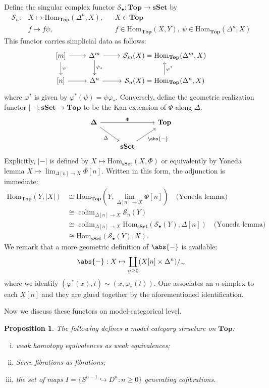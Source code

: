 \documentclass[psamsfonts]{amsart}
\newtheorem{prop}{Proposition}[section]
\theoremstyle{definition}
\newcommand{\Top}{\mathbf{Top}}
\newcommand{\sSet}{\mathbf{sSet}}
\newcommand{\Hom}{\mathrm{Hom}}
\DeclareMathOperator{\colim}{colim}
\numberwithin{equation}{section}
\begin{document}
Define the singular complex functor $\mathcal{S}_\bullet:\Top\to\sSet$ by
\begin{align*}
\mathcal{S}_n:&X\mapsto\Hom_{\Top}(\Delta^n,X),&&X\in\Top\\
&f\mapsto f\psi,&&f\in\Hom_{\Top}(X,Y),\ \psi\in\Hom_{\Top}(\Delta^n,X)
\end{align*}
This functor carries simplicial data as follows:
\[\begin{tikzcd}
{[m]}\arrow[d,"\varphi"]\arrow[r]&\Delta^m\arrow[r]\arrow[d,"\varphi_\ast"]&\mathcal{S}_m(X)=\Hom_{\Top}(\Delta^m,X)\\
{[n]}\arrow[r]&\Delta^n\arrow[r]&\mathcal{S}_n(X)=\Hom_{\Top}(\Delta^n,X)\arrow[u,"\varphi^\ast"']
\end{tikzcd}\]
where $\varphi^\ast$ is given by $\varphi^\ast(\psi)=\psi\varphi_\ast$. Conversely, define the geometric realization functor $|-|:\sSet\to\Top$ to be the Kan extension of $\Phi$ along $\Delta$.
\[\begin{tikzcd}
\mathbf{\Delta}\arrow[dr,"\Delta"']\arrow[rr,"\Phi"]&&\Top\\
&\sSet\arrow[ur,"\abs{-}"']
\end{tikzcd}\]
Explicitly, $|-|$ is defined by $X\mapsto\Hom_{\sSet}(X,\Phi)$ or equivalently by Yoneda lemma $X\mapsto\lim_{\Delta[n]\to X}\Phi[n]$. Written in this form, the adjunction is immediate:
\begin{align*}
\Hom_{\Top}(Y,|X|)&\cong\Hom_{\Top}(Y,\textstyle{\lim_{\Delta[n]\to X}\Phi[n]})\quad\textrm{(Yoneda lemma)}\\
&\cong\colim_{\Delta[n]\to X}\mathcal{S}_n(Y)\\
&\cong\colim_{\Delta[n]\to X}\Hom_{\sSet}(\mathcal{S}_\bullet(Y),\Delta[n])\quad\textrm{(Yoneda lemma)}\\
&\cong\Hom_{\sSet}(\mathcal{S}_\bullet(Y),X).
\end{align*}
We remark that a more geometric definition of $\abs{-}$ is available:
\[\abs{-}:X\mapsto\coprod_{n\geq0}(X[n]\times\Delta^n)/_{\sim}\]
where we identify $(\varphi^\ast(x),t)\sim(x,\varphi_\ast(t))$. One associates an $n$-simplex to each $X[n]$ and they are glued together by the aforementioned identification.\medbreak

Now we discuss these functors on model-categorical level.

\begin{prop}
The following defines a model category structure on $\Top$:
\begin{enumerate}[(i)]
    \item weak homotopy equivalences as weak equivalences;
    \item Serre fibrations as fibrations;
    \item the set of maps $I=\{S^{n-1}\hookrightarrow D^n:n\geq0\}$ generating cofibrations.
\end{enumerate}
\end{prop}
\end{document}
